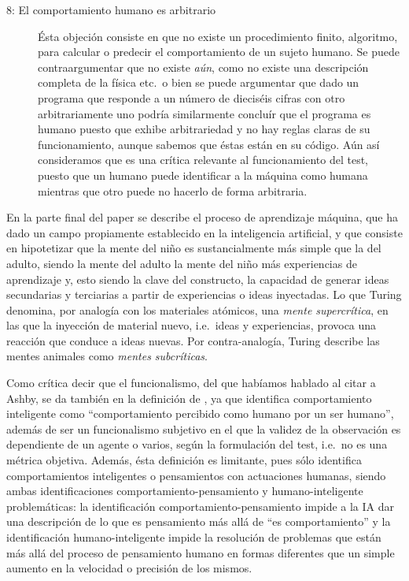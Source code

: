 \documentclass[12pt]{memoir}
\begin{document}
\begin{description}
	\item[8: El comportamiento humano es arbitrario] Ésta objeción consiste en que no existe un procedimiento finito, algoritmo, para calcular o predecir el comportamiento de un sujeto humano. Se puede contraargumentar que no existe \textit{aún}, como no existe una descripción completa de la física etc.\ o bien se puede argumentar que dado un programa que responde a un número de dieciséis cifras con otro arbitrariamente uno podría similarmente concluír que el programa es humano puesto que exhibe arbitrariedad y no hay reglas claras de su funcionamiento, aunque sabemos que éstas están en su código. Aún así consideramos que es una crítica relevante al funcionamiento del test, puesto que un humano puede identificar a la máquina como humana mientras que otro puede no hacerlo de forma arbitraria.
\end{description}

En la parte final del paper se describe el proceso de aprendizaje máquina, que ha dado un campo propiamente establecido en la inteligencia artificial, y que consiste en hipotetizar que la mente del niño es sustancialmente más simple que la del adulto, siendo la mente del adulto la mente del niño más experiencias de aprendizaje y, esto siendo la clave del constructo, la capacidad de generar ideas secundarias y terciarias a partir de experiencias o ideas inyectadas. Lo que Turing denomina, por analogía con los materiales atómicos, una \textit{mente supercrítica}, en las que la inyección de material nuevo, i.e.\ ideas y experiencias, provoca una reacción que conduce a ideas nuevas. Por contra-analogía, Turing describe las mentes animales como \textit{mentes subcríticas}.

Como crítica decir que el funcionalismo, del que habíamos hablado al citar a Ashby, se da también en la definición de \cite{Turing1950cmi}, ya que identifica comportamiento inteligente como ``comportamiento percibido como humano por un ser humano'', además de ser un funcionalismo subjetivo en el que la validez de la observación es dependiente de un agente o varios, según la formulación del test, i.e.\ no es una métrica objetiva. Además, ésta definición es limitante, pues sólo identifica comportamientos inteligentes o pensamientos con actuaciones humanas, siendo ambas identificaciones comportamiento-pensamiento y humano-inteligente problemáticas: la identificación comportamiento-pensamiento impide a la IA dar una descripción de lo que es pensamiento más allá de ``es comportamiento'' y la identificación humano-inteligente impide la resolución de problemas que están más allá del proceso de pensamiento humano en formas diferentes que un simple aumento en la velocidad o precisión de los mismos. 
\end{document}
